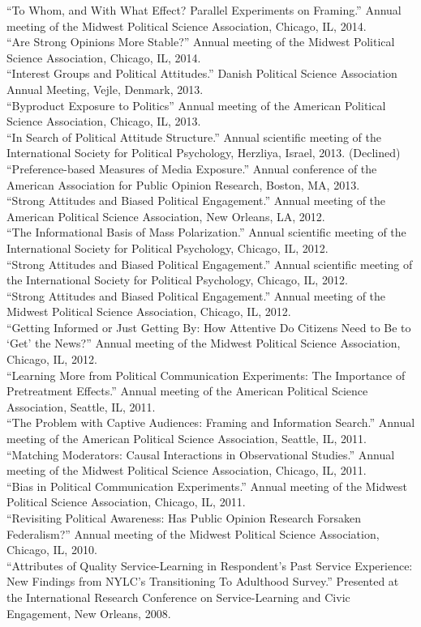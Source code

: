 \documentclass[12pt]{article}
\newcommand{\entry}[1]{\indent {\color{lg}\guillemotright}\hspace{2pt}#1\vspace{.25em}\\}
\begin{document}
	\entry{``To Whom, and With What Effect? Parallel Experiments on Framing.'' Annual meeting of the Midwest Political Science Association, Chicago, IL, 2014.}
	\entry{``Are Strong Opinions More Stable?'' Annual meeting of the Midwest Political Science Association, Chicago, IL, 2014.}
	\entry{``Interest Groups and Political Attitudes.'' Danish Political Science Association Annual Meeting, Vejle, Denmark, 2013.}
	\entry{``Byproduct Exposure to Politics'' Annual meeting of the American Political Science Association, Chicago, IL, 2013.}
	\entry{``In Search of Political Attitude Structure.'' Annual scientific meeting of the International Society for Political Psychology, Herzliya, Israel, 2013. (Declined)}
	\entry{``Preference-based Measures of Media Exposure.'' Annual conference of the American Association for Public Opinion Research, Boston, MA, 2013.}
	\entry{``Strong Attitudes and Biased Political Engagement.'' Annual meeting of the American Political Science Association, New Orleans, LA, 2012.}
	\entry{``The Informational Basis of Mass Polarization.'' Annual scientific meeting of the International Society for Political Psychology, Chicago, IL, 2012.}
	\entry{``Strong Attitudes and Biased Political Engagement.'' Annual scientific meeting of the International Society for Political Psychology, Chicago, IL, 2012.}
	\entry{``Strong Attitudes and Biased Political Engagement.'' Annual meeting of the Midwest Political Science Association, Chicago, IL, 2012.}
	\entry{``Getting Informed or Just Getting By: How Attentive Do Citizens Need to Be to `Get' the News?'' Annual meeting of the Midwest Political Science Association, Chicago, IL, 2012.}
	\entry{``Learning More from Political Communication Experiments: The Importance of Pretreatment Effects.'' Annual meeting of the American Political Science Association, Seattle, IL, 2011.}
	\entry{``The Problem with Captive Audiences: Framing and Information Search.'' Annual meeting of the American Political Science Association, Seattle, IL, 2011.}
	\entry{``Matching Moderators: Causal Interactions in Observational Studies.'' Annual meeting of the Midwest Political Science Association, Chicago, IL, 2011.}
	\entry{``Bias in Political Communication Experiments.'' Annual meeting of the Midwest Political Science Association, Chicago, IL, 2011.}
	\entry{``Revisiting Political Awareness: Has Public Opinion Research Forsaken Federalism?'' Annual meeting of the Midwest Political Science Association, Chicago, IL, 2010.}
	\entry{``Attributes of Quality Service-Learning in Respondent's Past Service Experience: New Findings from NYLC's Transitioning To Adulthood Survey.'' Presented at the International Research Conference on Service-Learning and Civic Engagement, New Orleans, 2008.}
\end{document}
